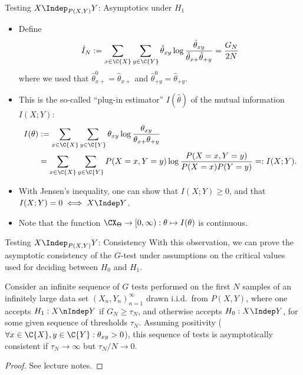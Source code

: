 \begin{frame}{Testing $X \Indep_{P(X,Y)} Y$: Asymptotics under $H_1$}
  \begin{itemize}
    \item Define
$$\hat I_N := \sum_{x\in\C{X}} \sum_{y\in\C{Y}} \hat \theta_{xy} \log \frac{\hat \theta_{xy}}{\hat \theta_{x+} \hat \theta_{+ y}}
    = \frac{G_N}{2N}$$
where we used that $\hat\theta^0_{x +} = \hat\theta_{x +}$ and $\hat\theta^0_{+ y} = \hat\theta_{+ y}$.
\item This is the so-called ``plug-in estimator'' $I(\hat\theta)$ of the mutual information $I(X;Y)$:
\begin{equation*}\begin{split}
  I(\theta) & := \sum_{x\in\C{X}}\sum_{y\in\C{Y}} \theta_{xy} \log \frac{\theta_{xy}}{\theta_{x +} \theta_{+ y}} \\
  & = \sum_{x\in\C{X}} \sum_{y\in\C{Y}} P(X=x,Y=y) \log \frac{P(X=x,Y=y)}{P(X=x) P(Y=y)} =: I(X;Y).
\end{split}\end{equation*}
\item With Jensen's inequality, one can show that $I(X;Y) \ge 0$, and that $I(X;Y) = 0 \iff X \Indep Y$.
\item Note that the function $\CX_\Theta \to [0,\infty) : \theta \mapsto I(\theta)$ is continuous.
  \end{itemize}
\end{frame}

\begin{frame}{Testing $X \Indep_{P(X,Y)} Y$: Consistency}
With this observation, we can prove the asymptotic consistency of the $G$-test under assumptions on the critical values used
for deciding between $H_0$ and $H_1$. 
\begin{Cor}[\ref{cor:G_test_consistency}]
Consider an infinite sequence of $G$ tests performed on the first $N$ samples of an infinitely large
data set $(X_n,Y_n)_{n=1}^\infty$ drawn i.i.d.\ from $P(X,Y)$, 
where one accepts $H_1 : X \nIndep Y$ if $G_N \ge \tau_N$, and otherwise accepts $H_0 : X \Indep Y$, 
for some given sequence of thresholds $\tau_N$.
Assuming positivity ($\forall x \in \C{X}, y\in \C{Y}: \theta_{xy} > 0$), 
this sequence of tests is asymptotically consistent if $\tau_N \to \infty$ but $\tau_N / N \to 0$.
\end{Cor}
\begin{proof}
See lecture notes.
\end{proof}
\end{frame}

